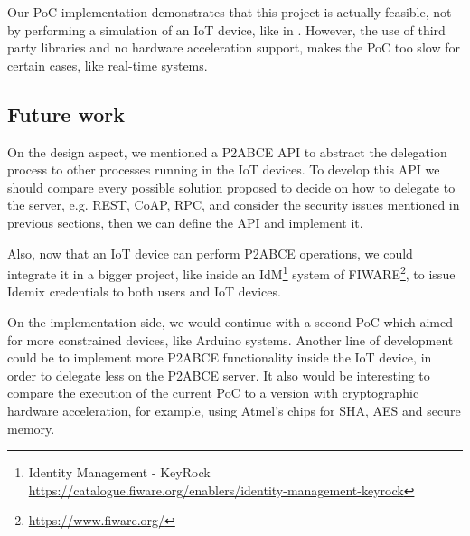 Our PoC implementation demonstrates that this project is actually feasible, not by performing a simulation of an IoT device, like in \cite{vanet}. However, the use of third party libraries and no hardware acceleration support, makes the PoC too slow for certain cases, like real-time systems.




\subsection{Future work}



On the design aspect, we mentioned a P2ABCE API to abstract the delegation process to other processes running in the IoT devices. To develop this API we should compare every possible solution proposed to decide on how to delegate to the server, e.g. REST, CoAP, RPC, and consider the security issues mentioned in previous sections, then we can define the API and implement it.

Also, now that an IoT device can perform P2ABCE operations, we could integrate it in a bigger project, like inside an IdM\footnote{Identity Management - KeyRock \url{https://catalogue.fiware.org/enablers/identity-management-keyrock}} system of FIWARE\footnote{\url{https://www.fiware.org/}}, to issue Idemix credentials to both users and IoT devices.%


On the implementation side, we would continue with a second PoC which aimed for more constrained devices, like Arduino systems. Another line of development could be to implement more P2ABCE functionality inside the IoT device, in order to delegate less on the P2ABCE server. It also would be interesting to compare the execution of the current PoC to a version with cryptographic hardware acceleration, for example, using Atmel's chips for SHA, AES and secure memory.



